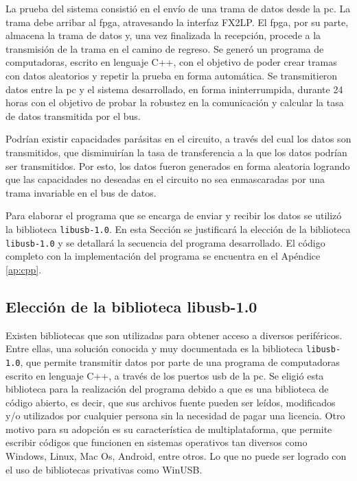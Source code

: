 
La prueba del sistema consistió en el envío de una trama de datos desde la \acrshort{pc}. La trama debe arribar al \acrshort{fpga}, atravesando la interfaz FX2LP.
El \acrshort{fpga}, por su parte, almacena la trama de datos y, una vez finalizada la recepción, procede a la transmisión de la trama en el camino de regreso. 
Se generó un programa de computadoras, escrito en lenguaje C++, con el objetivo de poder crear tramas con datos aleatorios y repetir la prueba en forma automática.
Se transmitieron datos entre la \acrshort{pc} y el sistema desarrollado, en forma ininterrumpida, durante 24 horas con el objetivo de probar la robustez en la comunicación y calcular la tasa de datos transmitida por el bus.

Podrían existir capacidades parásitas en el circuito, a través del cual los datos son transmitidos, que disminuirían la tasa de transferencia a la que los datos podrían ser transmitidos. Por esto, los datos fueron generados en forma aleatoria logrando que las capacidades no deseadas en el circuito no sea enmascaradas por una trama invariable en el bus de datos.

Para elaborar el programa que se encarga de enviar y recibir los datos se utilizó la biblioteca \verb|libusb-1.0|.
En esta Sección se justificará la elección de la biblioteca \verb|libusb-1.0| y se detallará la secuencia del programa desarrollado.
El código completo con la implementación del programa se encuentra en el Apéndice \ref{ap:cpp}.

\subsection{Elección de la biblioteca libusb-1.0}
	Existen bibliotecas que son utilizadas para obtener acceso a diversos periféricos. Entre ellas, una solución conocida y muy documentada es la biblioteca \verb|libusb-1.0|, que permite transmitir datos por parte de una programa de computadoras escrito en lenguaje C++, a través de los puertos \acrshort{usb} de la \acrshort{pc}.
	Se eligió esta biblioteca para la realización del programa debido a que es una biblioteca de código abierto, es decir, que sus archivos fuente pueden ser leídos, modificados y/o utilizados por cualquier persona sin la necesidad de pagar una licencia.  Otro motivo para su adopción es su característica de multiplataforma, que permite escribir códigos que funcionen en sistemas operativos tan diversos como Windows, Linux, Mac Os, Android, entre otros. Lo que no puede ser logrado con el uso de bibliotecas privativas como WinUSB.
	
